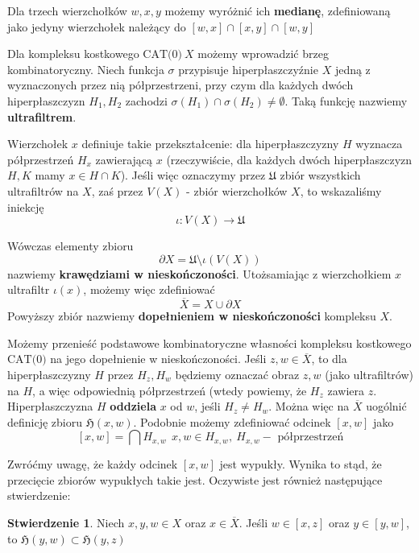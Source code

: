 \documentclass[licencjacka]{pracamgr}
\theoremstyle{definition}
\theoremstyle{definition}
\theoremstyle{definition}
\newtheorem{proposition}{Stwierdzenie}[section]
\theoremstyle{definition}
\theoremstyle{definition}
\theoremstyle{plain}
\theoremstyle{plain}
\begin{document}
Dla trzech wierzchołków $ w,x,y $ możemy wyróżnić ich \textbf{medianę}, zdefiniowaną 
jako jedyny wierzchołek należący do $ [w,x] \cap [x,y] \cap [w,y] $

Dla kompleksu kostkowego $ \text{CAT(0)}~ X$ możemy wprowadzić brzeg kombinatoryczny. 
Niech funkcja $ \sigma $ przypisuje hiperpłaszczyźnie $ X $ jedną z wyznaczonych przez nią 
półprzestrzeni, przy czym dla każdych dwóch hiperpłaszczyzn $ H_1, H_2 $ zachodzi 
$ \sigma(H_1) \cap \sigma(H_2) \neq \emptyset $. Taką funkcję nazwiemy \textbf{ultrafiltrem}.

Wierzchołek $ x $ definiuje takie przekształcenie: dla hiperpłaszczyzny $ H $ wyznacza 
półprzestrzeń $ H_x $ zawierającą $ x $ (rzeczywiście, dla każdych dwóch hiperpłaszczyzn 
$ H,K $ mamy $ x \in H \cap K $). Jeśli więc oznaczymy przez $\mathfrak{U}$ zbiór wszystkich 
ultrafiltrów na $ X $, zaś przez $ V (X) $ - zbiór wierzchołków $ X $, to wskazaliśmy iniekcję 
$$ \iota : V(X) \rightarrow \mathfrak{U} $$

Wówczas elementy zbioru $$ \partial X = \mathfrak{U} \setminus \iota(V(X)) $$
nazwiemy \textbf{krawędziami w nieskończoności}. Utożsamiając z wierzchołkiem $ x $ 
ultrafiltr $ \iota(x) $, możemy więc zdefiniować
$$ \overline{X} = X \cup \partial X $$
Powyższy zbiór nazwiemy \textbf{dopełnieniem w nieskończoności} kompleksu $ X $.

Możemy przenieść podstawowe kombinatoryczne własności 
kompleksu kostkowego $ \text{CAT(0)}$ 
na jego dopełnienie w nieskończoności. Jeśli $ z,w \in \overline{X} $, to dla 
hiperpłaszczyzny $ H $ przez $ H_z, H_w $ będziemy oznaczać obraz $ z,w $ 
(jako ultrafiltrów) na 
$ H $, a więc odpowiednią półprzestrzeń (wtedy powiemy, że $ H_z $ zawiera $ z $. 
Hiperpłaszczyzna $ H $ \textbf{oddziela} $ x $ od $ w $, 
jeśli $ H_z \neq H_w $. Można więc na $ \overline{X} $ uogólnić definicję zbioru 
$ \mathfrak{H}(x,w)$. Podobnie możemy zdefiniować odcinek $ [x,w] $ jako 
$$ [x,w] = \bigcap H_{x,w}  ~~ x,w \in H_{x,w}, ~ H_{x,w} - \text{ półprzestrzeń}$$

Zwróćmy uwagę, że każdy odcinek $ [x,w] $ jest wypukły. Wynika to stąd, że przecięcie 
zbiorów wypukłych takie jest. Oczywiste jest również następujące stwierdzenie: 

\begin{proposition}
	Niech $ x,y,w \in X $ oraz $ x \in \overline{X} $. Jeśli $ w \in [x,z] $ oraz 
	$ y \in [y,w] $, to $ \mathfrak{H}(y,w) \subset \mathfrak{H}(y,z)$
\end{proposition}
\end{document}
